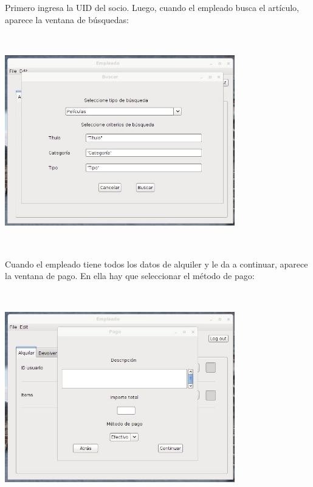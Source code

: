 Primero ingresa la UID del socio. Luego, cuando el empleado busca el artículo, aparece la ventana de búsquedas:\\
\includegraphics[width=10cm, height=10cm, keepaspectratio]{img/buscar-entrada.jpg}\\

Cuando el empleado tiene todos los datos de alquiler y le da a continuar, aparece la ventana de pago. En ella hay que seleccionar el método de pago:\\
\includegraphics[width=10cm, height=10cm, keepaspectratio]{img/pagar.jpg}\\
\clearpage

